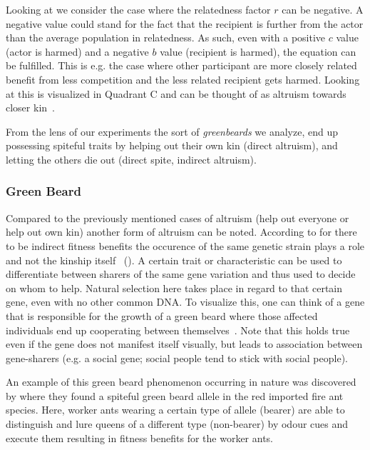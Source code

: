 \documentclass[sigconf]{acmart}
\newcommand{\greenbeards}{\textit{greenbeards}\xspace}
\begin{document}
    Looking at  we consider the case where the relatedness factor $r$ can be negative.
    A negative value could stand for the fact that the recipient is further from the actor than the average population in relatedness.
    As such, even with a positive $c$ value (actor is harmed) and a negative $b$ value (recipient is harmed), the equation can be fulfilled.
    This is e.g. the case where other participant are more closely related benefit from less competition and the less related recipient gets harmed.
    Looking at  this is visualized in Quadrant C and can be thought of as altruism towards closer kin~\cite{west_altruism_2010}.

    From the lens of our experiments the sort of \greenbeards we analyze, end up possessing spiteful traits by helping out their own kin (direct altruism), and letting the others die out (direct spite, indirect altruism).

    \subsubsection{Green Beard}
    Compared to the previously mentioned cases of altruism (help out everyone or help out own kin) another form of altruism can be noted.
    According to \citeauthor{hamiltonInnateSocialAptitudes1975} for there to be indirect fitness benefits the occurence of the same genetic strain plays a role and not the kinship itself~\cite{hamiltonInnateSocialAptitudes1975} ().
    A certain trait or characteristic can be used to differentiate between sharers of the same gene variation and thus used to decide on whom to help.
    Natural selection here takes place in regard to that certain gene, even with no other common DNA.
    To visualize this, one can think of a gene that is responsible for the growth of a green beard where those affected individuals end up cooperating between themselves~\cite{SelfishGeneRichard}.
    Note that this holds true even if the gene does not manifest itself visually, but leads to association between gene-sharers (e.g. a social gene; social people tend to stick with social people).

    An example of this green beard phenomenon occurring in nature was discovered by \citeauthor{keller_selfish_1998} \cite{keller_selfish_1998} where they found a spiteful green beard allele in the red imported fire ant species.
    Here, worker ants wearing a certain type of allele (bearer) are able to distinguish and lure queens of a different type (non-bearer) by odour cues and execute them resulting in fitness benefits for the worker ants.
\end{document}
